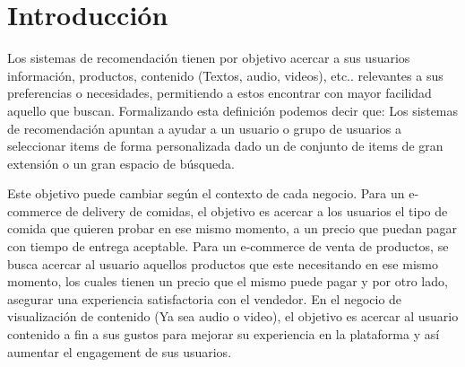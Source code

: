 \documentclass[11pt,a4paper,twoside]{tesis}
\begin{document}

\def\autor{Adrian Norberto Marino}
\def\tituloTesis{Sistemas de recomendación colaborativos e híbridos}
\def\runtitulo{Resumen}
\def\runtitle{Sistemas de recomendación colaborativos e híbridos}
\def\lugar{Buenos Aires, 2022}

%
\frontmatter
\pagestyle{empty}





\tableofcontents

\mainmatter
\pagestyle{headings}


\chapter{Introducción}

Los sistemas de recomendación tienen por objetivo acercar a sus usuarios información, productos, contenido (Textos,  audio, videos), etc.. relevantes a sus preferencias o necesidades, permitiendo a estos encontrar con mayor facilidad aquello que buscan.  Formalizando esta definición podemos decir que:  Los sistemas de recomendación apuntan a ayudar a un usuario o grupo de usuarios a seleccionar items de forma personalizada dado un de conjunto de items de gran extensión o un gran espacio de búsqueda.


Este objetivo puede cambiar según el contexto de cada negocio. Para un e-commerce de delivery de comidas, el objetivo es acercar a los usuarios el tipo de comida que quieren probar en ese mismo momento, a un precio que puedan pagar con tiempo de entrega aceptable. Para un e-commerce de venta de productos, se busca acercar al usuario aquellos productos que este necesitando en ese mismo momento, los cuales tienen un precio que el mismo puede pagar y por otro lado, asegurar una experiencia satisfactoria con el vendedor. En el negocio de visualización de contenido (Ya sea audio o video), el objetivo es acercar al usuario contenido a fin a sus gustos para mejorar su experiencia en la plataforma y así aumentar el engagement de sus usuarios.
\end{document}
